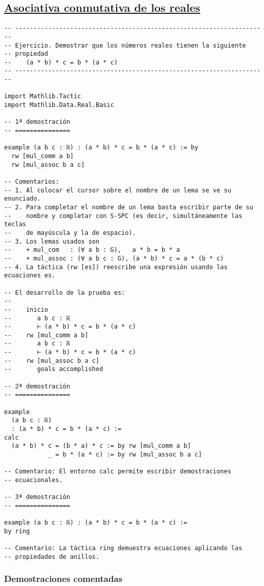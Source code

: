 \subsection{\href{./src/Basicos/Asociativa\_conmutativa\_de\_los\_reales.lean}{Asociativa conmutativa de los reales}}
\label{sec:org791588c}
\begin{verbatim}
-- ---------------------------------------------------------------------
-- Ejercicio. Demostrar que los números reales tienen la siguiente
-- propiedad
--    (a * b) * c = b * (a * c)
-- ---------------------------------------------------------------------

import Mathlib.Tactic
import Mathlib.Data.Real.Basic

-- 1ª demostración
-- ===============

example (a b c : ℝ) : (a * b) * c = b * (a * c) := by
  rw [mul_comm a b]
  rw [mul_assoc b a c]

-- Comentarios:
-- 1. Al colocar el cursor sobre el nombre de un lema se ve su enunciado.
-- 2. Para completar el nombre de un lema basta escribir parte de su
--    nombre y completar con S-SPC (es decir, simultáneamente las teclas
--    de mayúscula y la de espacio).
-- 3. Los lemas usados son
--    + mul_com   : (∀ a b : G),   a * b = b * a
--    + mul_assoc : (∀ a b c : G), (a * b) * c = a * (b * c)
-- 4. La táctica (rw [es]) reescribe una expresión usando las ecuaciones es.

-- El desarrollo de la prueba es:
--
--    inicio
--       a b c : ℝ
--       ⊢ (a * b) * c = b * (a * c)
--    rw [mul_comm a b]
--       a b c : ℝ
--       ⊢ (a * b) * c = b * (a * c)
--    rw [mul_assoc b a c]
--       goals accomplished

-- 2ª demostración
-- ===============

example
  (a b c : ℝ)
  : (a * b) * c = b * (a * c) :=
calc
  (a * b) * c = (b * a) * c := by rw [mul_comm a b]
            _ = b * (a * c) := by rw [mul_assoc b a c]

-- Comentario: El entorno calc permite escribir demostraciones
-- ecuacionales.

-- 3ª demostración
-- ===============

example (a b c : ℝ) : (a * b) * c = b * (a * c) :=
by ring

-- Comentario: La táctica ring demuestra ecuaciones aplicando las
-- propiedades de anillos.
\end{verbatim}
\subsubsection*{Demostraciones comentadas}

